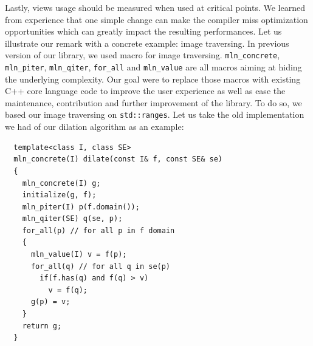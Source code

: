 Lastly, views usage should be measured when used at critical points. We learned from experience that one simple change
can make the compiler miss optimization opportunities which can greatly impact the resulting performances. Let us
illustrate our remark with a concrete example: image traversing. In previous version of our library, we used macro for
image traversing. \texttt{mln\_concrete}, \texttt{mln\_piter}, \texttt{mln\_qiter}, \texttt{for\_all} and
\texttt{mln\_value} are all macros aiming at hiding the underlying complexity. Our goal were to replace those macros
with existing C++ core language code to improve the user experience as well as ease the maintenance, contribution and
further improvement of the library. To do so, we based our image traversing on \texttt{std::ranges}. Let us take the old
implementation we had of our dilation algorithm as an example:
\begin{verbatim}
  template<class I, class SE>
  mln_concrete(I) dilate(const I& f, const SE& se)
  {
    mln_concrete(I) g;
    initialize(g, f);
    mln_piter(I) p(f.domain());
    mln_qiter(SE) q(se, p);
    for_all(p) // for all p in f domain
    {
      mln_value(I) v = f(p);
      for_all(q) // for all q in se(p)
        if(f.has(q) and f(q) > v)
          v = f(q);
      g(p) = v;
    }
    return g;
  }
\end{verbatim}

